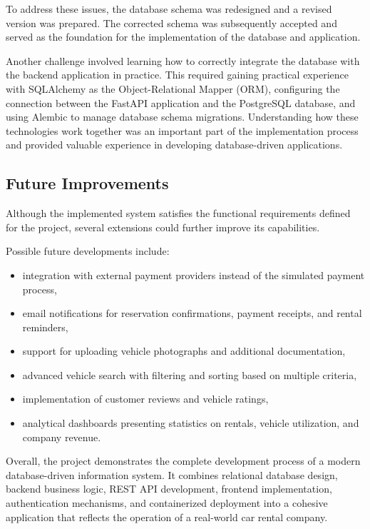 To address these issues, the database schema was redesigned and a revised version was prepared. The corrected schema was subsequently accepted and served as the foundation for the implementation of the database and application.

Another challenge involved learning how to correctly integrate the database with the backend application in practice. This required gaining practical experience with SQLAlchemy as the Object-Relational Mapper (ORM), configuring the connection between the FastAPI application and the PostgreSQL database, and using Alembic to manage database schema migrations. Understanding how these technologies work together was an important part of the implementation process and provided valuable experience in developing database-driven applications.

\subsection{Future Improvements}

Although the implemented system satisfies the functional requirements defined for the project, several extensions could further improve its capabilities.

Possible future developments include:

\begin{itemize}
    \item integration with external payment providers instead of the simulated payment process,
    \item email notifications for reservation confirmations, payment receipts, and rental reminders,
    \item support for uploading vehicle photographs and additional documentation,
    \item advanced vehicle search with filtering and sorting based on multiple criteria,
    \item implementation of customer reviews and vehicle ratings,
    \item analytical dashboards presenting statistics on rentals, vehicle utilization, and company revenue.
\end{itemize}

Overall, the project demonstrates the complete development process of a modern database-driven information system. It combines relational database design, backend business logic, REST API development, frontend implementation, authentication mechanisms, and containerized deployment into a cohesive application that reflects the operation of a real-world car rental company.
